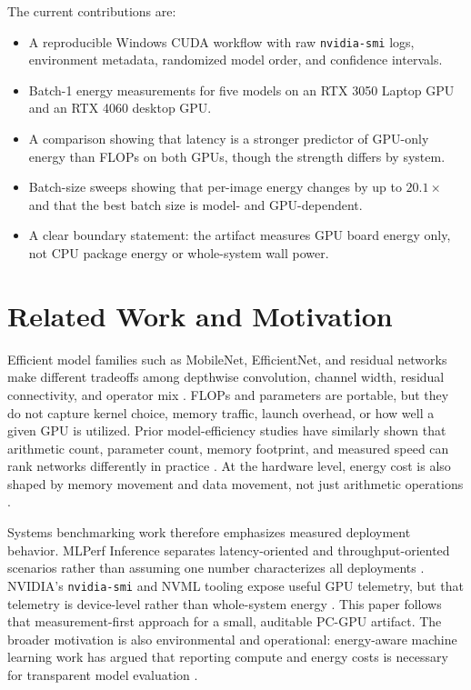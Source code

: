 \documentclass[conference]{IEEEtran}
\begin{document}
The current contributions are:
\begin{itemize}
\item A reproducible Windows CUDA workflow with raw \texttt{nvidia-smi} logs,
environment metadata, randomized model order, and confidence intervals.
\item Batch-1 energy measurements for five models on an RTX 3050 Laptop GPU
and an RTX 4060 desktop GPU.
\item A comparison showing that latency is a stronger predictor of GPU-only
energy than FLOPs on both GPUs, though the strength differs by system.
\item Batch-size sweeps showing that per-image energy changes by up to
$20.1\times$ and that the best batch size is model- and GPU-dependent.
\item A clear boundary statement: the artifact measures GPU board energy only,
not CPU package energy or whole-system wall power.
\end{itemize}

\section{Related Work and Motivation}

Efficient model families such as MobileNet, EfficientNet, and residual
networks make different tradeoffs among depthwise convolution, channel width,
residual connectivity, and operator mix \cite{mobilenetv2,efficientnet,resnet}.
FLOPs and parameters are portable, but they do not capture kernel choice,
memory traffic, launch overhead, or how well a given GPU is utilized.
Prior model-efficiency studies have similarly shown that arithmetic count,
parameter count, memory footprint, and measured speed can rank networks
differently in practice \cite{canziani}. At the hardware level, energy cost is
also shaped by memory movement and data movement, not just arithmetic
operations \cite{horowitz}.

Systems benchmarking work therefore emphasizes measured deployment behavior.
MLPerf Inference separates latency-oriented and throughput-oriented scenarios
rather than assuming one number characterizes all deployments \cite{mlperf}.
NVIDIA's \texttt{nvidia-smi} and NVML tooling expose useful GPU telemetry, but
that telemetry is device-level rather than whole-system energy \cite{nvidiasmi}.
This paper follows that measurement-first approach for a small, auditable
PC-GPU artifact. The broader motivation is also environmental and operational:
energy-aware machine learning work has argued that reporting compute and energy
costs is necessary for transparent model evaluation \cite{strubell}.
\end{document}
